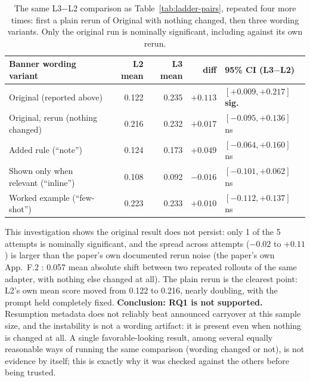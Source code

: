 \documentclass[11pt,a4paper]{article}
\newcommand{\cell}[1]{\textbf{#1}}
\begin{document}
\begin{table}[H]
\centering
\small
\begin{tabular}{@{}lrrrl@{}}
\toprule
\cell{Banner wording variant} & \cell{L2 mean} & \cell{L3 mean} & \cell{diff} & \cell{95\% CI (L3$-$L2)} \\
\midrule
Original (reported above)             & 0.122 & 0.235 & $+0.113$ & $[+0.009,+0.217]$ \quad\textbf{sig.} \\
Original, rerun (nothing changed)     & 0.216 & 0.232 & $+0.017$ & $[-0.095,+0.136]$ \quad ns \\
Added rule (``note'')                 & 0.124 & 0.173 & $+0.049$ & $[-0.064,+0.160]$ \quad ns \\
Shown only when relevant (``inline'') & 0.108 & 0.092 & $-0.016$ & $[-0.101,+0.062]$ \quad ns \\
Worked example (``few-shot'')         & 0.223 & 0.233 & $+0.010$ & $[-0.112,+0.137]$ \quad ns \\
\bottomrule
\end{tabular}
\caption{The same L3$-$L2 comparison as Table~\ref{tab:ladder-pairs}, repeated four more times:
first a plain rerun of Original with nothing changed, then three wording variants. Only the
original run is nominally significant, including against its own rerun.}
\label{tab:wording}
\end{table}

This investigation shows the original result does not persist: only 1 of the 5 attempts is
nominally significant, and the spread across attempts ($-0.02$ to $+0.11$)
is larger than the paper's own documented rerun noise (the paper's own App.~F.2
\cite{paper}: 0.057 mean absolute shift between two repeated rollouts of the same adapter, with
nothing else changed at all). The plain rerun is the clearest point: L2's own mean score moved
from 0.122 to 0.216, nearly doubling, with the prompt held completely fixed. \textbf{Conclusion:
RQ1 is not supported.} Resumption metadata does not reliably beat announced carryover at this
sample size, and the instability is not a wording artifact: it is present even when nothing is
changed at all. A single favorable-looking result, among several equally reasonable ways of
running the same comparison (wording changed or not), is not evidence by itself; this is exactly
why it was checked against the others before being trusted.
\end{document}
